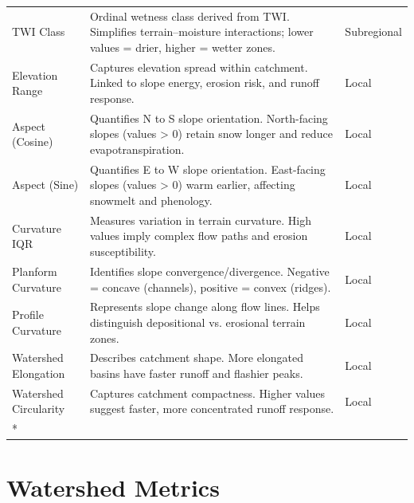 \documentclass[
  10pt,
]{article}
\begin{document}
\begin{longtable}[t]{lp{8cm}l}
TWI Class & Ordinal wetness class derived from TWI. Simplifies terrain–moisture
interactions; lower values = drier, higher = wetter zones. & Subregional\\
Elevation Range & Captures elevation spread within catchment. Linked to slope energy,
erosion risk, and runoff response. & Local\\
Aspect (Cosine) & Quantifies N to S slope orientation. North-facing slopes (values > 0)
retain snow longer and reduce evapotranspiration. & Local\\
Aspect (Sine) & Quantifies E to W slope orientation. East-facing slopes (values > 0)
warm earlier, affecting snowmelt and phenology. & Local\\
\addlinespace
Curvature IQR & Measures variation in terrain curvature. High values imply complex
flow paths and erosion susceptibility. & Local\\
Planform Curvature & Identifies slope convergence/divergence. Negative = concave
(channels), positive = convex (ridges). & Local\\
Profile Curvature & Represents slope change along flow lines. Helps distinguish
depositional vs. erosional terrain zones. & Local\\
Watershed Elongation & Describes catchment shape. More elongated basins have faster runoff
and flashier peaks. & Local\\
Watershed Circularity & Captures catchment compactness. Higher values suggest faster, more
concentrated runoff response. & Local\\*
\end{longtable}
\endgroup{}

\clearpage

\section*{ Watershed Metrics }

\begingroup\fontsize{8}{10}\selectfont
\end{document}
